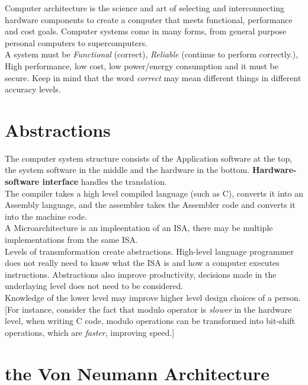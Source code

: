 \documentclass[11pt,a4paper,twocolumn]{book}
\begin{document}
Computer architecture is the science and art of selecting and interconnecting hardware components to create a computer that meets functional, performance and cost goals. Computer systems come in many  forms, from general purpose personal computers to supercomputers.\\

A system must be \textit{Functional} (correct), \textit{Reliable} (continue to perform correctly.), High performance, low cost, low power/energy consumption and it must be secure. Keep in mind that the word \textit{correct} may mean different things in different accuracy levels.\\

\section{Abstractions}

The computer system structure consists of the Application software at the top, the system software in the middle and the hardware in the bottom. \textbf{Hardware-software interface} handles the translation.\\

The compiler takes a high level compiled language (such as C), converts it into an Assembly language, and the assembler takes the Assembler code and converts it into the machine code.\\

A Microarchitecture is an impleentation of an ISA, there may be multiple implementations from the same ISA.\\

Levels of transmformation create abstractions. High-level language programmer does not really need to know what the ISA is and how a computer executes instructions. Abstractions also improve productivity, decisions made in the underlaying level does not need to be considered.\\

Knowledge of the lower level may improve higher level design choices of a person. [For instance, consider the fact that modulo operator is \textit{slower} in the hardware level, when writing C code, modulo operations can be transformed into bit-shift operations, which are \textit{faster}, improving speed.]

\section{the Von Neumann Architecture}
\end{document}
